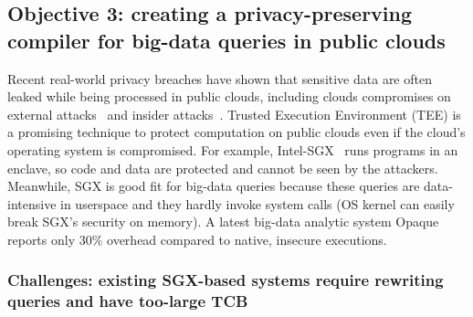 

\vspace{-.15in}\subsection{Objective 3: creating a privacy-preserving compiler 
for big-data queries in public clouds}\label{sec:obj3}\vspace{-.075in}


Recent real-world privacy breaches have shown that sensitive data are often 
leaked while being processed in public clouds, including clouds 
compromises on external attacks~\cite{icloud-breach} and 
insider attacks~\cite{top-threats}. Trusted Execution Environment 
(TEE) is a promising technique to protect computation on public clouds even if 
the cloud's operating system is compromised. For example, 
Intel-SGX~\cite{intel-sgx} runs programs in an enclave, so code and data are 
protected and cannot be seen by the attackers. Meanwhile, SGX is good fit for 
big-data queries because these queries are data-intensive in userspace and they 
hardly invoke system calls (OS kernel can easily break SGX's security on 
memory). A latest big-data analytic system Opaque~\cite{opaque:nsdi17} reports 
only 30\% overhead compared to native, insecure executions.

\vspace{-.15in}
\subsubsection{Challenges: existing SGX-based systems require rewriting 
queries and have too-large TCB} 
\label{sec:ift-problem}\vspace{-.075in}

